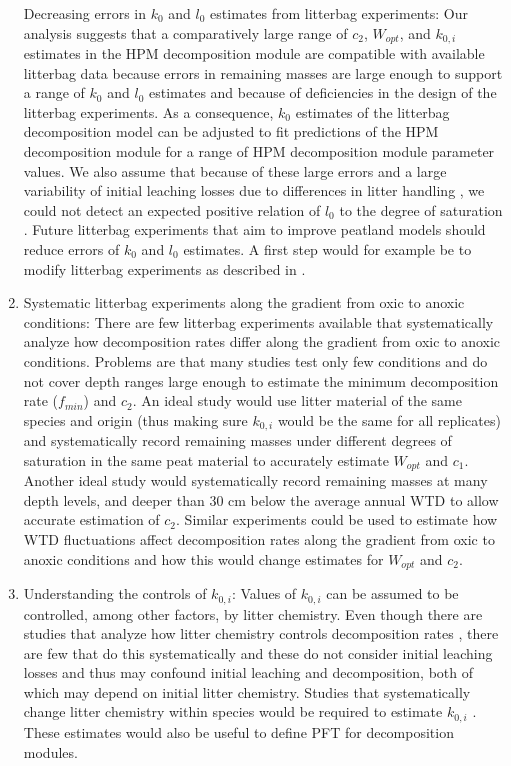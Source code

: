 \documentclass[esd, manuscript]{copernicus}
\begin{document}
\begin{enumerate}
  Decreasing errors in \(k_0\) and \(l_0\) estimates from litterbag experiments: Our analysis suggests that a comparatively large range of \(c_2\), \(W_{opt}\), and \(k_{0,i}\) estimates in the HPM decomposition module are compatible with available litterbag data because errors in remaining masses are large enough to support a range of \(k_0\) and \(l_0\) estimates and because of deficiencies in the design of the litterbag experiments. As a consequence, \(k_0\) estimates of the litterbag decomposition model can be adjusted to fit predictions of the HPM decomposition module for a range of HPM decomposition module parameter values. We also assume that because of these large errors and a large variability of initial leaching losses due to differences in litter handling \citep{Teickner.2025}, we could not detect an expected positive relation of \(l_0\) to the degree of saturation \citep{Lind.2022}. Future litterbag experiments that aim to improve peatland models should reduce errors of \(k_0\) and \(l_0\) estimates. A first step would for example be to modify litterbag experiments as described in \citet{Teickner.2025}.
\item
  Systematic litterbag experiments along the gradient from oxic to anoxic conditions: There are few litterbag experiments available that systematically analyze how decomposition rates differ along the gradient from oxic to anoxic conditions. Problems are that many studies test only few conditions and do not cover depth ranges large enough to estimate the minimum decomposition rate (\(f_{min}\)) and \(c_2\). An ideal study would use litter material of the same species and origin (thus making sure \(k_{0,i}\) would be the same for all replicates) and systematically record remaining masses under different degrees of saturation in the same peat material to accurately estimate \(W_{opt}\) and \(c_1\). Another ideal study would systematically record remaining masses at many depth levels, and deeper than 30 cm below the average annual WTD to allow accurate estimation of \(c_2\). Similar experiments could be used to estimate how WTD fluctuations affect decomposition rates along the gradient from oxic to anoxic conditions and how this would change estimates for \(W_{opt}\) and \(c_2\).
\item
  Understanding the controls of \(k_{0,i}\): Values of \(k_{0,i}\) can be assumed to be controlled, among other factors, by litter chemistry. Even though there are studies that analyze how litter chemistry controls decomposition rates \citep[e.g.,][]{Turetsky.2008}, there are few that do this systematically \citep[e.g.,][]{Bengtsson.2018} and these do not consider initial leaching losses and thus may confound initial leaching and decomposition, both of which may depend on initial litter chemistry. Studies that systematically change litter chemistry within species would be required to estimate \(k_{0,i}\) \citep[e.g.,][]{Siegenthaler.2010, Strakova.2010}. These estimates would also be useful to define PFT for decomposition modules.

\end{enumerate}
\end{document}
